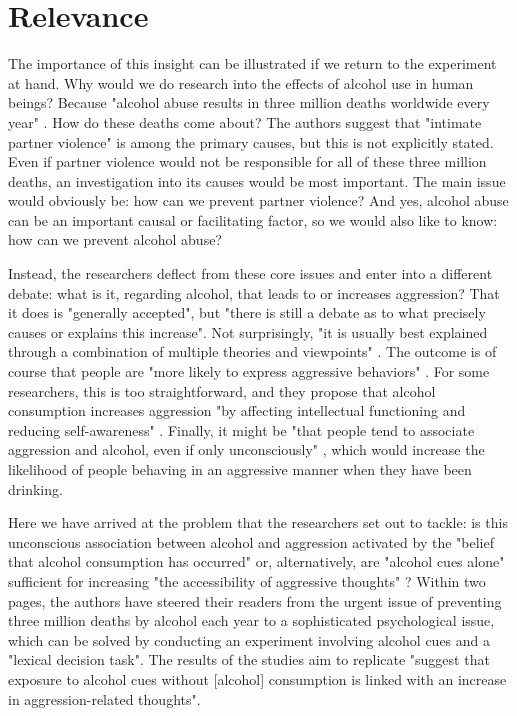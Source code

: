 \documentclass[twocolumn, serif, authordate, reflection]{jote-article}
\begin{document}
{}
\section*{Relevance}



The importance of this insight can be illustrated if we return to the experiment at hand. Why would we do research into the effects of alcohol use in human beings? Because "alcohol abuse results in three million deaths worldwide every year"  \parencite[p. 9]{Leboeuf2020}. How do these deaths come about? The authors suggest that "intimate partner violence" is among the primary causes, but this is not explicitly stated. Even if partner violence would not be responsible for all of these three million deaths, an investigation into its causes would be most important. The main issue would obviously be: how can we prevent partner violence? And yes, alcohol abuse can be an important causal or facilitating factor, so we would also like to know: how can we prevent alcohol abuse?

Instead, the researchers deflect from these core issues and enter into a different debate: what is it, regarding alcohol, that leads to or increases aggression? That it does is "generally accepted", but "there is still a debate as to what precisely causes or explains this increase". Not surprisingly, "it is usually best explained through a combination of multiple theories and viewpoints" \parencite[p. 10{Leboeuf2020}. That makes sense, but instead of informing the reader about this combined theory, the authors give a brief overview of rivalling theories (or hypotheses). For instance, drinking alcohol increases aggression, "by anesthetizing the part of our brain that usually keeps our aggressive impulses under control" \parencite[p. 10]{Leboeuf2020}. The outcome is of course that people are "more likely to express aggressive behaviors" \parencite[p. 10]{Leboeuf2020}. For some researchers, this is too straightforward, and they propose that alcohol consumption increases aggression "by affecting intellectual functioning and reducing self-awareness" \parencite[p. 10]{Leboeuf2020}. Finally, it might be "that people tend to associate aggression and alcohol, even if only unconsciously" \parencite[p. 10]{Leboeuf2020}, which would increase the likelihood of people behaving in an aggressive manner when they have been drinking.

Here we have arrived at the problem that the researchers set out to tackle: is this unconscious association between alcohol and aggression activated by the "belief that alcohol consumption has occurred" or, alternatively, are "alcohol cues alone"  sufficient for increasing "the accessibility of aggressive thoughts"  \parencite[p. 10]{Leboeuf2020}? Within two pages, the authors have steered their readers from the  urgent issue of preventing three million deaths by alcohol each year to a sophisticated psychological issue, which can be solved by conducting an experiment involving alcohol cues and a "lexical decision task". The results of the studies \textcite[p. 10]{Leboeuf2020} aim to replicate "suggest that exposure to alcohol cues without [alcohol] consumption is linked with an increase in aggression-related thoughts".
\end{document}
